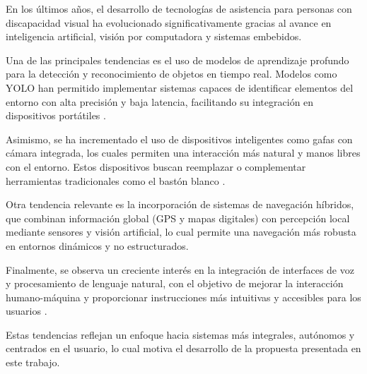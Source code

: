 En los últimos años, el desarrollo de tecnologías de asistencia para personas con discapacidad visual ha evolucionado significativamente gracias al avance en inteligencia artificial, visión por computadora y sistemas embebidos.

Una de las principales tendencias es el uso de modelos de aprendizaje profundo para la detección y reconocimiento de objetos en tiempo real. Modelos como YOLO han permitido implementar sistemas capaces de identificar elementos del entorno con alta precisión y baja latencia, facilitando su integración en dispositivos portátiles \cite{redmon2016yolo}.

Asimismo, se ha incrementado el uso de dispositivos inteligentes como gafas con cámara integrada, los cuales permiten una interacción más natural y manos libres con el entorno. Estos dispositivos buscan reemplazar o complementar herramientas tradicionales como el bastón blanco \cite{cinestavlentes}.

Otra tendencia relevante es la incorporación de sistemas de navegación híbridos, que combinan información global (GPS y mapas digitales) con percepción local mediante sensores y visión artificial, lo cual permite una navegación más robusta en entornos dinámicos y no estructurados.

Finalmente, se observa un creciente interés en la integración de interfaces de voz y procesamiento de lenguaje natural, con el objetivo de mejorar la interacción humano-máquina y proporcionar instrucciones más intuitivas y accesibles para los usuarios \cite{eyeAI2023}.

Estas tendencias reflejan un enfoque hacia sistemas más integrales, autónomos y centrados en el usuario, lo cual motiva el desarrollo de la propuesta presentada en este trabajo.